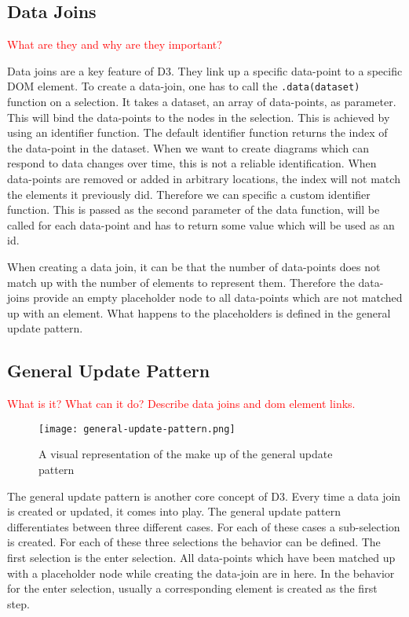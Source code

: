 \subsection{Data Joins}
\textcolor{red}{
What are they and why are they important?}

Data joins are a key feature of D3. They link up a specific data-point to a specific DOM element. To create a data-join, one has to call the \verb|.data(dataset)| function on a selection. It takes a dataset, an array of data-points, as parameter. This will bind the data-points to the nodes in the selection. This is achieved by using an identifier function. The default identifier function returns the index of the data-point in the dataset. When we want to create diagrams which can respond to data changes over time, this is not a reliable identification. When data-points are removed or added in arbitrary locations, the index will not match the elements it previously did. Therefore we can specific a custom identifier function. This is passed as the second parameter of the data function, will be called for each data-point and has to return some value which will be used as an id.

When creating a data join, it can be that the number of data-points does not match up with the number of elements to represent them. Therefore the data-joins provide an empty placeholder node to all data-points which are not matched up with an element. What happens to the placeholders is defined in the general update pattern.

\subsection{General Update Pattern}
\textcolor{red}{
What is it? What can it do? Describe data joins and dom element links.}

\begin{figure}
    \label{fig:general-update-pattern}
    \texttt{[image: general-update-pattern.png]}
    \caption[general-update-pattern]{A visual representation of the make up of the general update pattern\cite{bostock_2012}}
\end{figure}

The general update pattern is another core concept of D3. Every time a data join is created or updated, it comes into play. The general update pattern differentiates between three different cases. For each of these cases a sub-selection is created. For each of these three selections the behavior can be defined. The first selection is the enter selection. All data-points which have been matched up with a placeholder node while creating the data-join are in here. In the behavior for the enter selection, usually a corresponding element is created as the first step.

